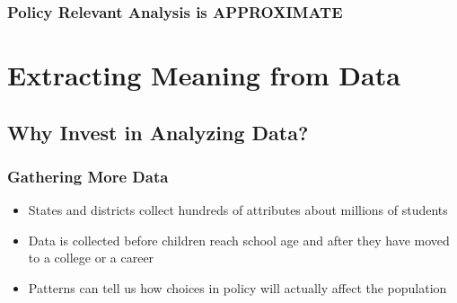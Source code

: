 \documentclass[12pt,handout]{beamer}
\begin{document}
{
\begin{frame}[plain]
\frametitle{Policy Relevant Analysis is APPROXIMATE}
\end{frame}
}


\section{Extracting Meaning from Data}
\label{sec:extrct-meaning}

\subsection{Why Invest in Analyzing Data?}
\begin{frame}
\frametitle{Gathering More Data}
\begin{itemize}
  \item States and districts collect hundreds of attributes about millions of students
  \item Data is collected before children reach school age and after they have moved to a college or a career
  \item Patterns can tell us how choices in policy will actually affect the population
\end{itemize}
\end{frame}
\end{document}
